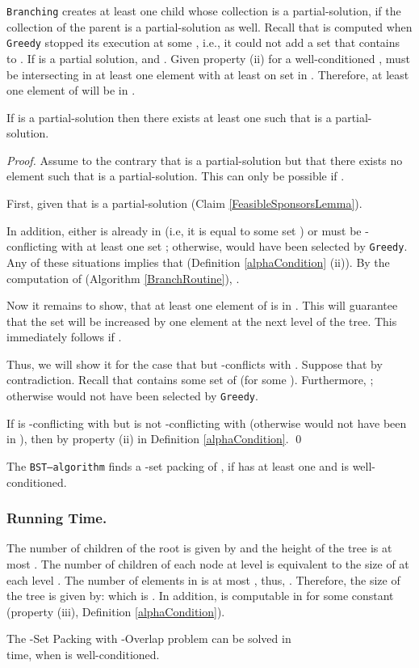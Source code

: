 \texttt{Branching} creates at least one child whose collection is a partial-solution, if the collection of the parent is a partial-solution as well. Recall that  is computed when \texttt{Greedy} stopped its execution at some , i.e., it could not add a set that contains  to . If  is a partial solution,  and . Given property (ii) for a well-conditioned ,  must be intersecting in at least one element with at least on set in . Therefore, at least one element of  will be in .

\begin{lemma}\label{BranchingLemma}
If  is a partial-solution then there exists at least one  such that  is a partial-solution.
\end{lemma}

\begin{proof}
Assume to the contrary that  is a partial-solution but that there exists no element  such that  is a partial-solution. 
This can only be possible if .

First, given that  is a partial-solution  (Claim \ref{FeasibleSponsorsLemma}).

In addition, either  is already in  (i.e, it is equal to some set ) or  must be -conflicting with at least one set ; otherwise,  would have been selected by \texttt{Greedy}. 
Any of these situations implies that  (Definition \ref{alphaCondition} (ii)).
By the computation of  (Algorithm \ref{BranchRoutine}), .

Now it remains to show, that at least one element of  is in . This will guarantee that the set  will be increased by one element at the next level of the tree. This immediately follows if .

Thus, we will show it for the case that  but  -conflicts with .
Suppose that  by contradiction.
Recall that  contains some set  of  (for some ).
Furthermore, ; otherwise  would not have been selected by \texttt{Greedy}.

If  is -conflicting with  but  is not -conflicting with  (otherwise  would not have been in ), then  by property (ii) in Definition \ref{alphaCondition}. \qed
\end{proof} 


\begin{theorem}
The \texttt{BST--algorithm} finds a -set packing of , if  has at least one and  is well-conditioned.
\end{theorem}

\subsubsection{Running Time.}
The number of children of the root is given by   and the height of the tree is at most .  The number of children of each node at level  is equivalent to the size of  at each level . The number of elements in  is at most , thus, . Therefore, the size of the tree is given by:  which is . In addition,   is computable in  for some constant  (property (iii), Definition \ref{alphaCondition}).

\begin{theorem}\label{runningtime}
The -Set Packing with -Overlap problem can be solved in \\  time, when  is well-conditioned.
\end{theorem}